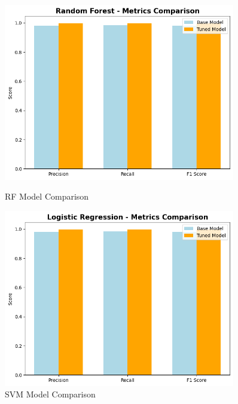             \begin{figure}[h]
                    \centering
                    \begin{minipage}[c]{0.47\textwidth}
                        \centering
                        \includegraphics[width=0.9\textwidth]{../figures/plots/section2/Random_Forest_Metric_comparison.png}
                        \caption{RF Model Comparison}
                        \label{fig:logistic_tuning}
                    \end{minipage}
                    \hfill
                    \begin{minipage}[c]{0.47\textwidth}
                        \centering
                        \includegraphics[width=0.9\textwidth]{../figures/plots/section2/Logistic_Regression_Metric_comparison.png}
                        \caption{SVM Model Comparison}
                        \label{fig:logistic_cm}
                    \end{minipage}
                \end{figure}
                
        \clearpage %
        